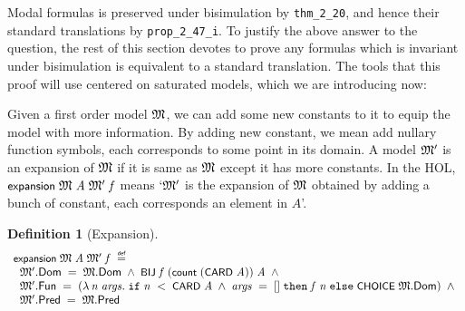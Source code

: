 \documentclass[letterpaper]{article}
\newtheorem{defn}{Definition}
\renewcommand{\HOLConst}[1]{{\textsf{\upshape\small #1}}}
\renewcommand{\HOLinline}[1]{\ensuremath{#1}}
\renewcommand{\HOLKeyword}[1]{\texttt{#1}}
\newenvironment{holmath}{\begin{displaymath}\begin{array}{l}}{\end{array}\end{displaymath}\ignorespacesafterend}
\begin{document}
Modal formulas is preserved under bisimulation by \texttt{thm_2_20}, and hence their standard translations by \texttt{prop_2_47_i}. To justify the above answer to the question, the rest of this section devotes to prove any formulas which is invariant under bisimulation is equivalent to a standard translation. The tools that this proof will use centered on saturated models, which we are introducing now:

Given a first order model \HOLinline{\HOLFreeVar{\ensuremath{\mathfrak{M}}}}, we can add some new constants to it to equip the model with more information. By adding new constant, we mean add nullary function symbols, each corresponds to some point in its domain. A model \HOLinline{\HOLFreeVar{\ensuremath{\mathfrak{M}'}}} is an expansion of \HOLinline{\HOLFreeVar{\ensuremath{\mathfrak{M}}}} if it is same as \HOLinline{\HOLFreeVar{\ensuremath{\mathfrak{M}}}} except it has more constants. In the HOL, \HOLinline{\HOLConst{expansion}\;\HOLFreeVar{\ensuremath{\mathfrak{M}}}\;\HOLFreeVar{A}\;\HOLFreeVar{\ensuremath{\mathfrak{M}'}}\;\HOLFreeVar{f}} means `\HOLinline{\HOLFreeVar{\ensuremath{\mathfrak{M}'}}} is the expansion of \HOLinline{\HOLFreeVar{\ensuremath{\mathfrak{M}}}} obtained by adding a bunch of constant, each corresponds an element in $A$'. 
\begin{defn}[Expansion]
\begin{holmath}
  \HOLConst{expansion}\;\HOLFreeVar{\ensuremath{\mathfrak{M}}}\;\HOLFreeVar{A}\;\HOLFreeVar{\ensuremath{\mathfrak{M}'}}\;\HOLFreeVar{f}\;\HOLSymConst{\HOLTokenDefEquality{}}\\
\;\;\HOLFreeVar{\ensuremath{\mathfrak{M}'}}.\HOLFieldName{Dom}\;\HOLSymConst{=}\;\HOLFreeVar{\ensuremath{\mathfrak{M}}}.\HOLFieldName{Dom}\;\HOLSymConst{\HOLTokenConj{}}\;\HOLConst{BIJ}\;\HOLFreeVar{f}\;(\HOLConst{count}\;(\HOLConst{CARD}\;\HOLFreeVar{A}))\;\HOLFreeVar{A}\;\HOLSymConst{\HOLTokenConj{}}\\
\;\;\HOLFreeVar{\ensuremath{\mathfrak{M}'}}.\HOLFieldName{Fun}\;\HOLSymConst{=}\;(\HOLTokenLambda{}\HOLBoundVar{n}\;\HOLBoundVar{args}.\;\HOLKeyword{if}\;\HOLBoundVar{n}\;\HOLSymConst{\HOLTokenLt{}}\;\HOLConst{CARD}\;\HOLFreeVar{A}\;\HOLSymConst{\HOLTokenConj{}}\;\HOLBoundVar{args}\;\HOLSymConst{=}\;[]\;\HOLKeyword{then}\;\HOLFreeVar{f}\;\HOLBoundVar{n}\;\HOLKeyword{else}\;\HOLConst{CHOICE}\;\HOLFreeVar{\ensuremath{\mathfrak{M}}}.\HOLFieldName{Dom})\;\HOLSymConst{\HOLTokenConj{}}\\
\;\;\HOLFreeVar{\ensuremath{\mathfrak{M}'}}.\HOLFieldName{Pred}\;\HOLSymConst{=}\;\HOLFreeVar{\ensuremath{\mathfrak{M}}}.\HOLFieldName{Pred}
\end{holmath}
\end{defn}
\end{document}
